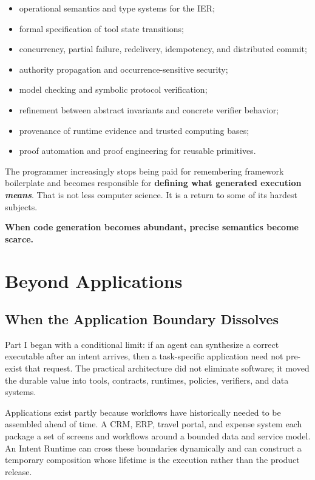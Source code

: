 \documentclass[10pt,oneside,openany]{book}
\begin{document}
\begin{itemize}
\item operational semantics and type systems for the IER;
\item formal specification of tool state transitions;
\item concurrency, partial failure, redelivery, idempotency, and distributed commit;
\item authority propagation and occurrence-sensitive security;
\item model checking and symbolic protocol verification;
\item refinement between abstract invariants and concrete verifier behavior;
\item provenance of runtime evidence and trusted computing bases;
\item proof automation and proof engineering for reusable primitives.
\end{itemize}

The programmer increasingly stops being paid for remembering framework boilerplate and becomes responsible for \textbf{defining what generated execution \emph{means}}. That is not less computer science. It is a return to some of its hardest subjects.

\begin{center}
\sffamily\bfseries
When code generation becomes abundant, precise semantics become scarce.
\end{center}

\part{Beyond Applications}

\chapter{When the Application Boundary Dissolves}

Part I began with a conditional limit: if an agent can synthesize a correct executable after an intent arrives, then a task-specific application need not pre-exist that request. The practical architecture did not eliminate software; it moved the durable value into tools, contracts, runtimes, policies, verifiers, and data systems.

Applications exist partly because workflows have historically needed to be assembled ahead of time. A CRM, ERP, travel portal, and expense system each package a set of screens and workflows around a bounded data and service model. An Intent Runtime can cross these boundaries dynamically and can construct a temporary composition whose lifetime is the execution rather than the product release.
\end{document}
